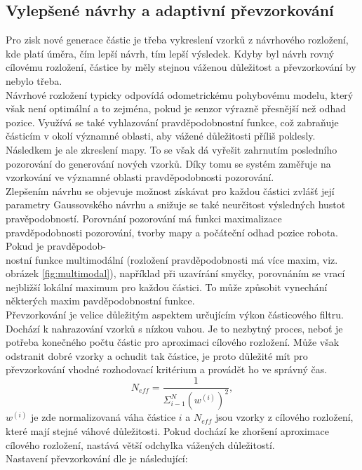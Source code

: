 \documentclass[12pt]{report}
\begin{document}
\subsection{Vylepšené návrhy a adaptivní převzorkování}
Pro zisk nové generace částic je třeba vykreslení vzorků z návrhového rozložení, kde platí úměra, čím lepší návrh, tím lepší výsledek. Kdyby byl návrh rovný cílovému rozložení, částice by měly stejnou váženou důležitost a převzorkování by nebylo třeba. \\
\indent Návrhové rozložení typicky odpovídá odometrickému pohybovému modelu, který však není optimální a to zejména, pokud je senzor výrazně přesnější než odhad pozice. Využívá se také vyhlazování pravděpodobnostní funkce, což zabraňuje částicím v okolí významné oblasti, aby vážené důležitosti příliš poklesly. Následkem je ale zkreslení mapy. To se však dá vyřešit zahrnutím posledního pozorování do generování nových vzorků. Díky tomu se systém zaměřuje na vzorkování ve významné oblasti pravděpodobnosti pozorování.\\
\indent Zlepšením návrhu se objevuje možnost získávat pro každou částici zvlášť její parametry Gaussovského návrhu a snižuje se také neurčitost výsledných hustot pravěpodobností. Porovnání pozorování má funkci maximalizace pravděpodobnosti pozorování, tvorby mapy a počáteční odhad pozice robota. Pokud je pravděpodob-\\nostní funkce multimodální (rozložení pravděpodobnosti má více maxim, viz. obrázek \ref{fig:multimodal}), například při uzavírání smyčky, porovnáním se vrací nejbližší lokální maximum pro každou částici. To může způsobit vynechání některých maxim pavděpodobnostní funkce.\\
\indent Převzorkování je velice důležitým aspektem určujícím výkon částicového filtru. Dochází k nahrazování vzorků s nízkou vahou. Je to nezbytný proces, neboť je potřeba konečného počtu částic pro aproximaci cílového rozložení. Může však odstranit dobré vzorky a ochudit tak částice, je proto důležité mít pro převzorkování vhodné rozhodovací kritérium a provádět ho ve správný čas. 
\begin{equation}
	N_{eff}=\frac{1}{\varSigma_{i-1}^N(w^{(i)})^2},
\end{equation} 
$w^{(i)}$ je zde normalizovaná váha částice $i$ a $N_{eff}$ jsou vzorky z cílového rozložení, které mají stejné váhové důležitosti. Pokud dochází ke zhoršení aproximace cílového rozložení, nastává větší odchylka vážených důležitostí.\\
Nastavení převzorkování dle \cite{Grisetti2007} je následující:
\end{document}
